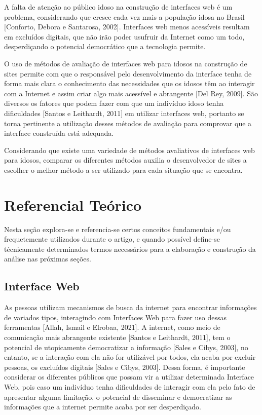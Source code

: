 \documentclass[12pt]{article}
\begin{document}
    A falta de atenção ao público idoso na construção de interfaces web é um problema, considerando que cresce cada vez mais a população idosa no Brasil [Conforto, Debora e Santarosa, 2002]. Interfaces web menos acessíveis resultam em excluídos digitais, que não irão poder usufruir da Internet como um todo, desperdiçando o potencial democrático que a tecnologia permite.

    O uso de métodos de avaliação de interfaces web para idosos na construção de sites permite com que o responsável pelo desenvolvimento da interface tenha de forma mais clara o conhecimento das necessidades que os idosos têm ao interagir com a Internet e assim criar algo mais acessível e abrangente [Del Rey, 2009]. São diversos os fatores que podem fazer com que um indivíduo idoso tenha dificuldades [Santos e Leithardt, 2011] em utilizar interfaces web, portanto se torna pertinente a utilização desses métodos de avaliação para comprovar que a interface construída está adequada. 

    Considerando que existe uma variedade de métodos avaliativos de interfaces web para idosos, comparar os diferentes métodos auxilia o desenvolvedor de sites a escolher o melhor método a ser utilizado para cada situação que se encontra.

\section{Referencial Teórico}
    Nesta seção explora-se e referencia-se certos conceitos fundamentais e/ou frequetemente utilizados durante o artigo, e quando possível define-se técnicamente determinados termos necessários para a elaboração e construção da análise nas próximas seções.

\subsection{Interface Web}

    As pessoas utilizam mecanismos de busca da internet para encontrar informações de variados tipos, interagindo com Interfaces Web para fazer uso dessas ferramentas [Allah, Ismail e Elrobaa, 2021]. A internet, como meio de comunicação mais abrangente existente [Santos e Leithardt, 2011], tem o potencial de utopicamente democratizar a informação [Sales e Cibys, 2003], no entanto, se a interação com ela não for utilizável por todos, ela acaba por excluir pessoas, os excluídos digitais [Sales e Cibys, 2003]. Dessa forma, é importante considerar os diferentes públicos que possam vir a utilizar determinada Interface Web, pois caso um indivíduo tenha dificuldades de interagir com ela pelo fato de apresentar alguma limitação, o potencial de disseminar e democratizar as informações que a internet permite acaba por ser desperdiçado.
\end{document}
